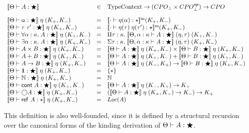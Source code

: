 \documentclass[12pt]{article}
\begin{document}
\begin{displaymath}
\begin{array}{lcl}\interp{\judgeWK{A}{\bigstar}} &\in& \mathrm{Type Context} \to (CPO_\bot \times CPO^{op}_\bot) \to CPO 
\\[1em]
\interp{\judgeWK{\alpha}{\bigstar}}\;\eta\;(K_+,K_-) & = & 
    \interpmono{\judgeWK[\cdot]{\eta(\alpha)}{\star}}(K_+, K_-) 
\\
\interp{\judgeWK{\tau\;\tau'}{\bigstar}}\;\eta\;(K_+,K_-) & = & 
    \interpmono{\judgeWK[\cdot]{\eta(\tau)\;\eta(\tau')}{\star}}(K_+, K_-) 
\\
\interp{\judgeWK{\forall \alpha:\kappa.\;A}{\bigstar}}\;\eta\;(K_+,K_-) & = & 
    \Pi \tau:\kappa.\; 
        \interp{\judgeWK[\Theta, \alpha:\kappa]{A}{\bigstar}}\;(\eta,\tau)\;(K_+,K_-) 
\\
\interp{\judgeWK{\exists \alpha:\kappa.\;A}{\bigstar}}\;\eta\;(K_+,K_-) & = & 
    \Sigma \tau:\kappa.\; 
        \interp{\judgeWK[\Theta, \alpha:\kappa]{A}{\bigstar}}\;(\eta,\tau)\;(K_+,K_-) 
\\
\interp{\judgeWK{A \times B}{\bigstar}}\;\eta\;(K_+,K_-) & = & 
   \interp{\judgeWK{A}{\bigstar}}\;\eta\;(K_+,K_-) \times
   \interp{\judgeWK{B}{\bigstar}}\;\eta\;(K_+,K_-) 
\\
\interp{\judgeWK{A + B}{\bigstar}}\;\eta\;(K_+,K_-) & = & 
   \interp{\judgeWK{A}{\bigstar}}\;\eta\;(K_+,K_-) +
   \interp{\judgeWK{B}{\bigstar}}\;\eta\;(K_+,K_-) 
\\
\interp{\judgeWK{A \to B}{\bigstar}}\;\eta\;(K_+,K_-) & = & 
   \interp{\judgeWK{A}{\bigstar}}\;\eta\;(K_-,K_+) \to
   \interp{\judgeWK{B}{\bigstar}}\;\eta\;(K_+,K_-) 
\\
\interp{\judgeWK{\unittype}{\bigstar}}\;\eta\;(K_+, K_-) & = & \setof{*} 
\\

\interp{\judgeWK{\N}{\bigstar}}\;\eta\;(K_+, K_-) & = &  \N 
\\
\interp{\judgeWK{\cont{A}}{\bigstar}}\;\eta\;(K_+,K_-) & = & 
   \interp{\judgeWK{A}{\bigstar}}\;\eta\;(K_-,K_+) \to K_+
\\
\interp{\judgeWK{\monad{A}}{\bigstar}}\;\eta\;(K_+,K_-) & = & 
   (\interp{\judgeWK{A}{\bigstar}}\;\eta\;(K_+,K_-) \to K_-) \to K_+
\\
\interp{\judgeWK{\reftype{A}}{\star}}\;\eta\;(K_+, K_-) & = & Loc(A) 
\\
\end{array}
\end{displaymath}

This definition is also well-founded, since it is defined by a
structural recursion over the canonical forms of the kinding
derivation of ${\Theta} \vdash {A} : {\bigstar}$. 
\end{document}

